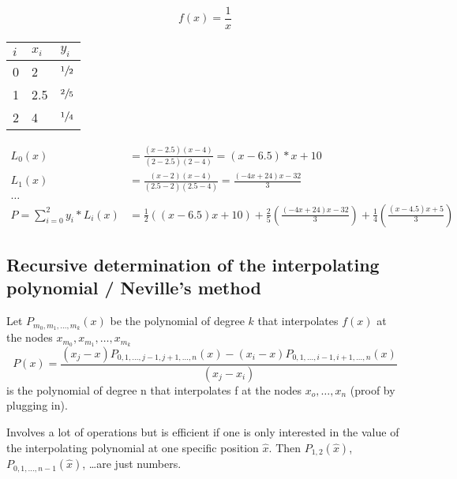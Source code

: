 \begin{example}
    \begin{equation*}
        f(x)= \frac{1}{x}
    \end{equation*}
    \begin{center}
        \begin{tabular}{l l l}
            \toprule
            $i$ & $x_i$ & $y_i$          \\
            \midrule
            0   & 2     & $\sfrac{1}{2}$ \\
            1   & 2.5   & $\sfrac{2}{5}$ \\
            2   & 4     & $\sfrac{1}{4}$ \\
            \bottomrule
        \end{tabular}
    \end{center}

    \begin{align*}
        L_0(x) &= \frac{(x-2.5)(x-4)}{(2-2.5)(2-4)}=(x-6.5)*x+10\\
        L_1(x) &= \frac{(x-2)(x-4)}{(2.5-2)(2.5-4)}=\frac{(-4x+24)x-32}{3}\\
        \ldots\\
        P=\sum_{i=0}^{2}y_i*L_i(x) &= \frac{1}{2}((x-6.5)x+10)+ \frac{2}{5} \left( \frac{(-4x+24)x-32}{3} \right)+\frac{1}{4}\left( \frac{(x-4.5)x+5}{3} \right)
    \end{align*}
\end{example}

\subsection{Recursive determination of the interpolating polynomial / Neville's method}\label{subsec:recursive-determination-of-the-interpolating-polynomial-/-neville's-method}
Let $P_{m_0, m_1, \dots, m_k} (x)$ be the polynomial of degree $k$ that interpolates $f(x)$ at the nodes $x_{m_0}, x_{m_1},\ldots,x_{m_k}$
\begin{equation*}
    P(x)= \frac{(x_j-x)P_{0,1,\ldots, j-1, j+1, \ldots, n}(x)-(x_i-x)P_{0,1,\ldots, i-1, i+1, \ldots, n}(x)}{(x_j-x_i)}
\end{equation*}
is the polynomial of degree n that interpolates f at the nodes $x_o, \ldots, x_n$ (proof by plugging in).

Involves a lot of operations but is efficient if one is only interested in the value of the interpolating polynomial at one specific position $\hat{x}$.
Then $P_{1,2}(\hat{x})$, $P_{0,1,\ldots, n-1}(\hat{x})$, \ldots are just numbers.


